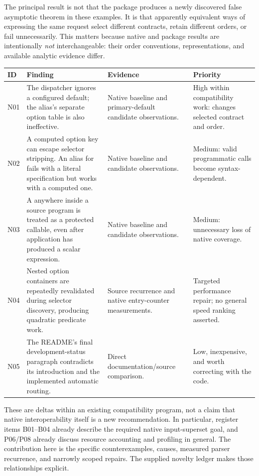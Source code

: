 \documentclass[11pt,letterpaper]{article}
\newcommand{\code}[1]{\texttt{\detokenize{#1}}}
\begin{document}
The principal result is not that the package produces a newly discovered false
asymptotic theorem in these examples. It is that apparently equivalent ways of
expressing the same request select different contracts, retain different
orders, or fail unnecessarily. This matters because native and package results
are intentionally \emph{not} interchangeable: their order conventions,
representations, and available analytic evidence differ.

\begin{longtable}{@{}p{}p{}p{}p{}@{}}
\toprule
ID & Finding & Evidence & Priority\\\midrule\endhead
N01 & The dispatcher ignores a configured \code{"Backend"} default; the alias's separate option table is also ineffective. & Native baseline and primary-default candidate observations. & High within compatibility work: changes selected contract and order.\\[5pt]
N02 & A computed option key can escape selector stripping. An alias for \code{"Backend"} fails with a literal specification but works with a computed one. & Native baseline and candidate observations. & Medium: valid programmatic calls become syntax-dependent.\\[5pt]
N03 & A \code{Function} anywhere inside a source program is treated as a protected callable, even after application has produced a scalar expression. & Native baseline and candidate observations. & Medium: unnecessary loss of native coverage.\\[5pt]
N04 & Nested option containers are repeatedly revalidated during selector discovery, producing quadratic predicate work. & Source recurrence and native entry-counter measurements. & Targeted performance repair; no general speed ranking asserted.\\[5pt]
N05 & The README's final development-status paragraph contradicts its introduction and the implemented automatic routing. & Direct documentation/source comparison. & Low, inexpensive, and worth correcting with the code.\\
\bottomrule
\end{longtable}

These are deltas within an existing compatibility program, not a claim that
native interoperability itself is a new recommendation. In particular,
register items B01--B04 already describe the required native input-superset
goal, and P06/P08 already discuss resource accounting and profiling in general.
The contribution here is the specific counterexamples, causes, measured
parser recurrence, and narrowly scoped repairs. The supplied novelty ledger
makes those relationships explicit.
\end{document}
